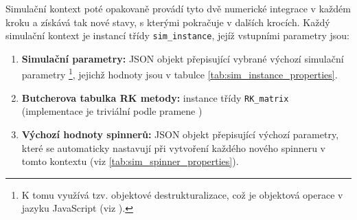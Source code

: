 Simulační kontext poté opakovaně provádí tyto dvě numerické integrace v každém kroku a získává tak nové stavy, s kterými pokračuje v dalších krocích. Každý simulační kontext je instancí třídy \texttt{sim\_instance}, jejíž vstupními parametry jsou:
\begin{enumerate}
    \item \textbf{Simulační parametry:} JSON objekt přepisující vybrané výchozí simulační parametry \footnote{K tomu využívá tzv. objektové destrukturalizace, což je objektová operace v jazyku JavaScript (viz \cite{JS_deconstruction}).}, jejichž hodnoty jsou v tabulce \ref{tab:sim_instance_properties}.
    \item \textbf{Butcherova tabulka RK metody:} instance třídy \texttt{RK\_matrix} (implementace je triviální podle pramene \cite{Butcher_tab_def})
    \item \textbf{Výchozí hodnoty spinnerů:} JSON objekt přepisující výchozí parametry, které se automaticky nastavují při vytvoření každého nového spinneru v tomto kontextu (viz \autoref{tab:sim_spinner_properties}).
\end{enumerate}

\clearpage

